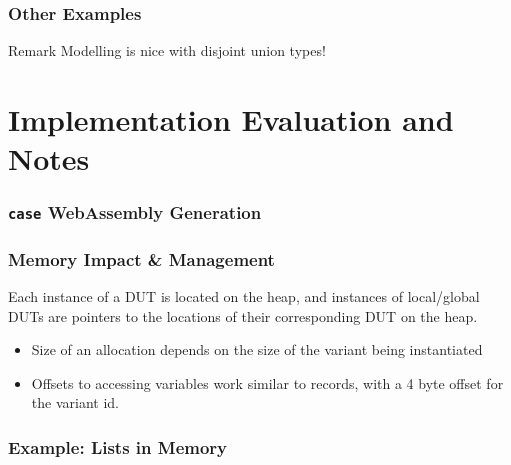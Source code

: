 \documentclass{beamer}
\begin{document}
\begin{frame}
\frametitle{Other Examples}
    
\usebox{\exampleImagination}

\begin{block}{Remark}
Modelling is nice with disjoint union types!
\end{block}
\end{frame}

\section{Implementation Evaluation and Notes}


\begin{frame}
 \frametitle{\texttt{case} WebAssembly Generation}
\end{frame}

\begin{frame}
\frametitle{Memory Impact \& Management}

Each instance of a DUT is located on the heap, and instances of local/global DUTs are pointers to the locations of their corresponding DUT on the heap.
\begin{itemize}
 \item <1-> Size of an allocation depends on the size of the variant being instantiated
 \item Offsets to accessing variables work similar to records, with a 4 byte offset for the variant id.
\end{itemize}

\begin{figure}
  
\end{figure}
\end{frame}

\begin{frame}
\frametitle{Example: Lists in Memory}
\begin{figure}
  
\end{figure}
\end{frame}
\end{document}
